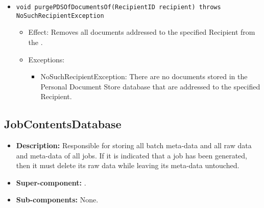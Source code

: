 \begin{itemize}
\begin{itemize}
		\item \texttt{void purgePDSOfDocumentsOf(RecipientID recipient) throws NoSuchRecipientException}
		\begin{itemize}
			\item Effect: Removes all documents addressed to the specified Recipient from the .
			\item Exceptions:
			\begin{itemize}
				\item NoSuchRecipientException: There are no documents stored in the Personal Document Store database that are addressed to the specified Recipient.
			\end{itemize}
		\end{itemize}
	\end{itemize}
\end{itemize}

\subsection{JobContentsDatabase}
\begin{itemize}
    \item \textbf{Description:} Responsible for storing all batch meta-data and all raw data and meta-data of all jobs. If it is indicated that a job has been generated, then it must delete its raw data while leaving its meta-data untouched.
    \item \textbf{Super-component:} .
    \item \textbf{Sub-components:} None.
\end{itemize}

